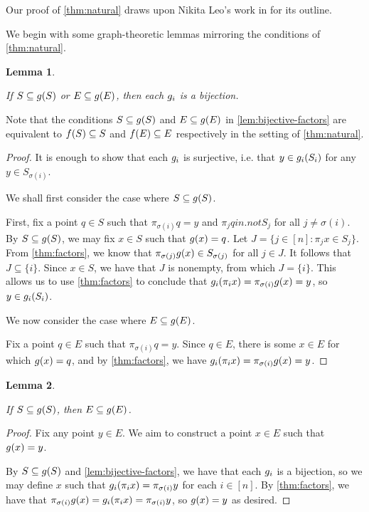 \documentclass{amsart}
\newtheorem{lemma}{Lemma}[section]
\theoremstyle{definition}
\begin{document}
Our proof of \autoref{thm:natural} draws upon Nikita Leo's work in \autocite{haller:2022}
for its outline.

We begin with some graph-theoretic lemmas mirroring the conditions of \autoref{thm:natural}.

\begin{lemma} \label{lem:bijective-factors}

  If $S \subseteq g(S)$ or $E \subseteq g(E)$, then each $g_i$ is a bijection.
\end{lemma}

Note that the conditions $S \subseteq g(S)$ and $E \subseteq g(E)$ in \autoref{lem:bijective-factors} are equivalent to $f(S) \subseteq S$ and $f(E) \subseteq E$ respectively in the setting of \autoref{thm:natural}.

\begin{proof} 

  It is enough to show that each $g_i$ is surjective, i.e. that $y \in g_i (S_i)$ for any $y \in S_{\sigma(i)}$.

  We shall first consider the case where $S \subseteq g(S)$.

  First, fix a point $q \in S$ such that $\pi_{\sigma(i)} q = y$ and $\pi_j q in.not S_j$ for all $j \neq \sigma(i)$. By $S \subseteq g(S)$, we may fix $x \in S$ such that $g(x) = q$. Let $J = \{j \in [n] \colon \pi_j x \in S_j\}$. From  \autoref{thm:factors}, we know that $\pi_{\sigma(j)} g(x) \in S_{\sigma(j)}$ for all $j \in J$. It follows that $J \subseteq \{i\}$. Since $x \in S$, we have that $J$ is nonempty, from which $J = \{i\}$. This allows us to use  \autoref{thm:factors} to conclude that $g_i (\pi_i x) = \pi_{\sigma(i)} g(x) = y$, so $y \in g_i (S_i)$.

  We now consider the case where $E \subseteq g(E)$.

  Fix a point $q \in E$ such that $\pi_{\sigma(i)} q = y$. Since $q \in E$, there is some $x \in E$ for which $g(x) = q$, and by  \autoref{thm:factors}, we have $g_i (\pi_i x) = \pi_{\sigma(i)} g(x) = y$.
\end{proof}


\begin{lemma} \label{lem:sphere-implies-extreme}

  If $S \subseteq g(S)$, then $E \subseteq g(E)$.
\end{lemma}

\begin{proof} 

  Fix any point $y \in E$. We aim to construct a point $x \in E$ such that $g(x)=y$.

  By $S \subseteq g(S)$ and \autoref{lem:bijective-factors}, we have that each $g_i$ is a bijection, so we may define $x$ such that $g_i (\pi_i x) = \pi_{\sigma(i)} y$ for each $i \in [n]$. By  \autoref{thm:factors}, we have that $\pi_{\sigma(i)} g(x) = g_i (\pi_i x) = \pi_{\sigma(i)} y$, so $g(x) = y$ as desired.
\end{proof}
\end{document}
